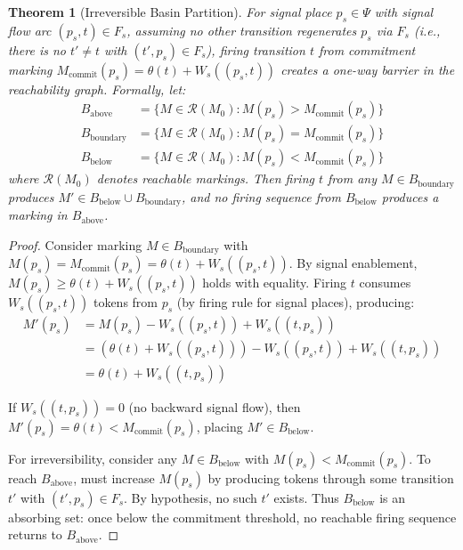 \documentclass[10pt,letterpaper]{article}
\newtheorem{theorem}{Theorem}
\begin{document}
\begin{theorem}[Irreversible Basin Partition]
For signal place $p_s \in \Psi$ with signal flow arc $(p_s,t) \in F_s$,
assuming no other transition regenerates $p_s$ via $F_s$ (i.e., there is no
$t' \neq t$ with $(t',p_s) \in F_s$), firing transition $t$ from commitment
marking $M_{\text{commit}}(p_s) = \theta(t) + W_s((p_s,t))$ creates a one-way
barrier in the reachability graph. Formally, let:
\begin{align*}
B_{\text{above}} &= \{M \in \mathcal{R}(M_0) : M(p_s) > M_{\text{commit}}(p_s)\} \\
B_{\text{boundary}} &= \{M \in \mathcal{R}(M_0) : M(p_s) = M_{\text{commit}}(p_s)\} \\
B_{\text{below}} &= \{M \in \mathcal{R}(M_0) : M(p_s) < M_{\text{commit}}(p_s)\}
\end{align*}
where $\mathcal{R}(M_0)$ denotes reachable markings. Then firing $t$ from any $M \in B_{\text{boundary}}$ produces $M' \in B_{\text{below}} \cup B_{\text{boundary}}$, and no firing sequence from $B_{\text{below}}$ produces a marking in $B_{\text{above}}$.
\end{theorem}

\begin{proof}
Consider marking $M \in B_{\text{boundary}}$ with
$M(p_s) = M_{\text{commit}}(p_s) = \theta(t) + W_s((p_s,t))$.
By signal enablement, $M(p_s) \geq \theta(t) + W_s((p_s,t))$ holds with equality. Firing $t$ consumes $W_s((p_s,t))$ tokens from $p_s$ (by firing rule for signal places), producing:
\begin{align*}
M'(p_s) &= M(p_s) - W_s((p_s,t)) + W_s((t,p_s)) \\
&= (\theta(t) + W_s((p_s,t))) - W_s((p_s,t)) + W_s((t,p_s)) \\
&= \theta(t) + W_s((t,p_s))
\end{align*}

If $W_s((t,p_s)) = 0$ (no backward signal flow), then
$M'(p_s) = \theta(t) < M_{\text{commit}}(p_s)$,
placing $M' \in B_{\text{below}}$.

For irreversibility, consider any $M \in B_{\text{below}}$ with $M(p_s) < M_{\text{commit}}(p_s)$. To reach $B_{\text{above}}$, must increase $M(p_s)$ by producing tokens through some transition $t'$ with $(t',p_s) \in F_s$. By hypothesis, no such $t'$ exists. Thus $B_{\text{below}}$ is an absorbing set: once below the commitment threshold, no reachable firing sequence returns to $B_{\text{above}}$.
\end{proof}
\end{document}
